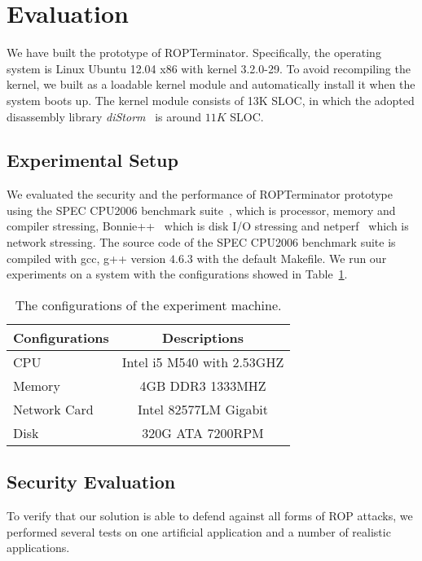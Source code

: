 \section{Evaluation} \label{sec:eva}
We have built the prototype of ROPTerminator. Specifically, the operating system is Linux Ubuntu 12.04 x86 with kernel 3.2.0-29. To avoid recompiling the kernel, we built \name as a loadable kernel module and automatically install it when the system boots up. The kernel module consists of 13K SLOC, in which the adopted disassembly library \emph{diStorm}~\cite{distorm} is around $11K$ SLOC.


\subsection{Experimental Setup}
We evaluated the security and the performance of ROPTerminator prototype using the SPEC CPU2006 benchmark suite~\cite{speccpu2006}, which is processor, memory and compiler stressing, Bonnie++~\cite{bonnie} which is disk I/O stressing and netperf~\cite{netperf} which is network stressing.
The source code of the SPEC CPU2006 benchmark suite is compiled with gcc, g++ version $4.6.3$ with the default Makefile.
We run our experiments on a system with the configurations showed in Table~\ref{tab:config}. %

\begin{table}
  \centering
  \begin{tabular}{|l|c|}
  \hline
   Configurations   &   Descriptions\\ \hline
   CPU              &   Intel i5 M540 with 2.53GHZ\\ \hline
   Memory           &   4GB DDR3 1333MHZ\\ \hline
   Network Card     &   Intel 82577LM Gigabit\\ \hline
   Disk             &   320G ATA 7200RPM\\ \hline
  \end{tabular}
  \caption{The configurations of the experiment machine.}\label{tab:config}
\end{table}



\subsection{Security Evaluation}
To verify that our solution is able to defend against all forms of ROP attacks, we performed several tests on one artificial application and a number of realistic applications. %

